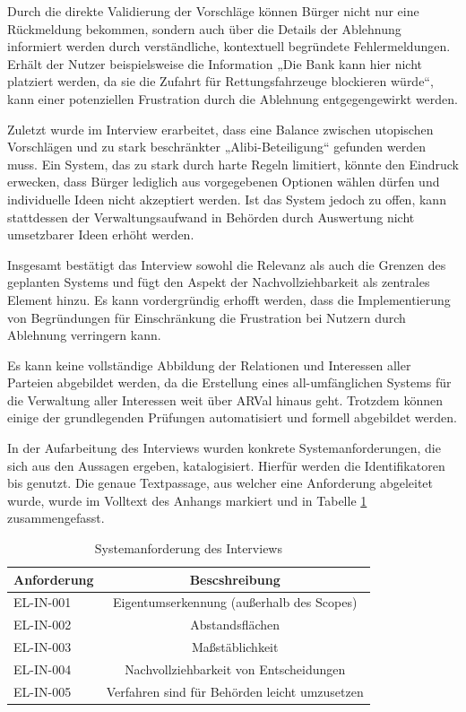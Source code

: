 Durch die direkte Validierung der Vorschläge können Bürger nicht nur eine Rückmeldung bekommen, sondern auch über die Details der Ablehnung informiert werden durch verständliche, kontextuell begründete Fehlermeldungen. Erhält der Nutzer beispielsweise die Information „Die Bank kann hier nicht platziert werden, da sie die Zufahrt für Rettungsfahrzeuge blockieren würde“, kann einer potenziellen Frustration durch die Ablehnung entgegengewirkt werden.

\medskip

Zuletzt wurde im Interview erarbeitet, dass eine Balance zwischen utopischen Vorschlägen und zu stark beschränkter „Alibi-Beteiligung“ gefunden werden muss. Ein System, das zu stark durch harte Regeln limitiert, könnte den Eindruck erwecken, dass Bürger lediglich aus vorgegebenen Optionen wählen dürfen und individuelle Ideen nicht akzeptiert werden. Ist das System jedoch zu offen, kann stattdessen der Verwaltungsaufwand in Behörden durch Auswertung nicht umsetzbarer Ideen erhöht werden.

\medskip

Insgesamt bestätigt das Interview sowohl die Relevanz als auch die Grenzen des geplanten Systems und fügt den Aspekt der Nachvollziehbarkeit als zentrales Element hinzu. Es kann vordergründig erhofft werden, dass die Implementierung von Begründungen für Einschränkung die Frustration bei Nutzern durch Ablehnung verringern kann.

Es kann keine vollständige Abbildung der Relationen und Interessen aller Parteien abgebildet werden, da die Erstellung eines all-umfänglichen Systems für die Verwaltung aller Interessen weit über ARVal hinaus geht. Trotzdem können einige der grundlegenden Prüfungen automatisiert und formell abgebildet werden.

\medskip

In der Aufarbeitung des Interviews wurden konkrete Systemanforderungen, die sich aus den Aussagen ergeben, katalogisiert. Hierfür werden die Identifikatoren  bis  genutzt. Die genaue Textpassage, aus welcher eine Anforderung abgeleitet wurde, wurde im Volltext des Anhangs markiert und in Tabelle \ref{tab:interview anforderungen} zusammengefasst.

\begin{table}[!h]
\begin{center}
    \begin{tabular}{ | l | c | }
      \hline
      Anforderung & Bescshreibung \\ \hline \hline
      EL-IN-001 & Eigentumserkennung (außerhalb des Scopes) \\ \hline
      EL-IN-002 & Abstandsflächen \\ \hline
      EL-IN-003 & Maßstäblichkeit \\ \hline
      EL-IN-004 & Nachvollziehbarkeit von Entscheidungen \\ \hline
      EL-IN-005 & Verfahren sind für Behörden leicht umzusetzen \\ \hline
    \end{tabular}
\caption{Systemanforderung des Interviews}
\label{tab:interview anforderungen}
\end{center}
\end{table}

